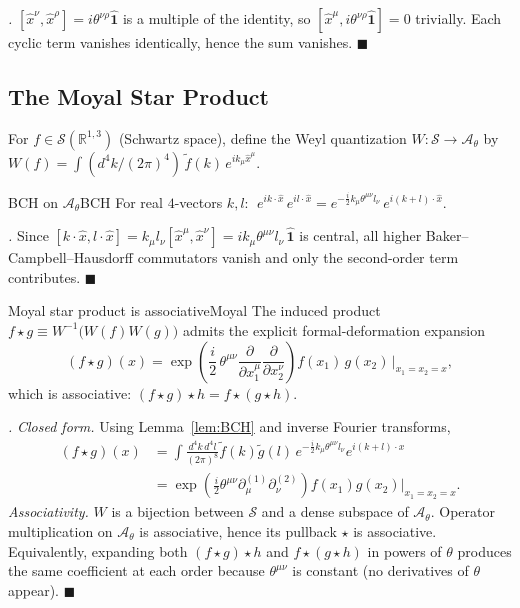 \documentclass[11pt,a4paper]{article}
\theoremstyle{myrmk}
\renewenvironment{proof}[1][\proofname]{%
  \par\noindent\textit{#1.}\enspace\ignorespaces}{\hfill$\blacksquare$\par\medskip}
\newcommand{\Identity}{\hat{\mathbf{1}}}
\begin{document}
\begin{proof}
$[\hat x^\nu,\hat x^\rho]=i\theta^{\nu\rho}\Identity$ is a multiple of the identity,
so $[\hat x^\mu,i\theta^{\nu\rho}\Identity]=0$ trivially. Each cyclic term vanishes
identically, hence the sum vanishes.
\end{proof}

\subsection{The Moyal Star Product}

For $f\in\mathcal{S}(\mathbb{R}^{1,3})$ (Schwartz space), define the Weyl quantization
$W:\mathcal{S}\to\mathcal{A}_\theta$ by
$W(f) = \int(d^4k/(2\pi)^4)\,\tilde f(k)\,e^{ik_\mu\hat x^\mu}$.

\begin{lemma}{BCH on $\mathcal{A}_\theta$}{BCH}
For real $4$-vectors $k,l$:
$\;e^{ik\cdot\hat x}\,e^{il\cdot\hat x} = e^{-\tfrac{i}{2}k_\mu\theta^{\mu\nu}l_\nu}\,
e^{i(k+l)\cdot\hat x}$.
\end{lemma}

\begin{proof}
Since $[k\cdot\hat x,l\cdot\hat x]=k_\mu l_\nu[\hat x^\mu,\hat x^\nu]
=ik_\mu\theta^{\mu\nu}l_\nu\,\Identity$ is central, all higher Baker--Campbell--Hausdorff
commutators vanish and only the second-order term contributes.
\end{proof}

\begin{theorem}{Moyal star product is associative}{Moyal}
The induced product $f\star g\equiv W^{-1}\!\big(W(f)W(g)\big)$ admits the explicit
formal-deformation expansion
\begin{equation}
  (f\star g)(x) = \exp\!\left(\frac{i}{2}\,\theta^{\mu\nu}
    \frac{\partial}{\partial x_1^\mu}\frac{\partial}{\partial x_2^\nu}\right)
    f(x_1)\,g(x_2)\,\bigg|_{x_1=x_2=x},
  \label{eq:moyal}
\end{equation}
which is associative: $(f\star g)\star h = f\star(g\star h)$.
\end{theorem}

\begin{proof}
\emph{Closed form.} Using Lemma~\ref{lem:BCH} and inverse Fourier transforms,
\begin{align*}
  (f\star g)(x)
  &= \int\!\frac{d^4k\,d^4l}{(2\pi)^8}\tilde f(k)\tilde g(l)\,
     e^{-\tfrac{i}{2}k_\mu\theta^{\mu\nu}l_\nu}e^{i(k+l)\cdot x}\\
  &= \exp\!\left(\frac{i}{2}\theta^{\mu\nu}\partial^{(1)}_\mu\partial^{(2)}_\nu\right)
     f(x_1)g(x_2)\big|_{x_1=x_2=x}.
\end{align*}
\emph{Associativity.} $W$ is a bijection between $\mathcal{S}$ and a dense subspace of
$\mathcal{A}_\theta$. Operator multiplication on $\mathcal{A}_\theta$ is associative,
hence its pullback $\star$ is associative. Equivalently, expanding both
$(f\star g)\star h$ and $f\star(g\star h)$ in powers of $\theta$ produces the same
coefficient at each order because $\theta^{\mu\nu}$ is constant (no derivatives of
$\theta$ appear).
\end{proof}
\end{document}
